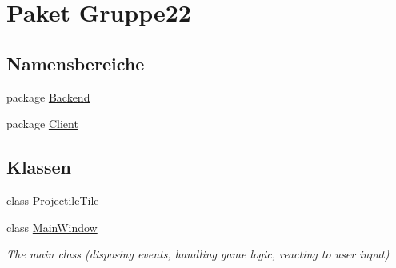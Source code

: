 \hypertarget{namespace_gruppe22}{\section{Paket Gruppe22}
\label{namespace_gruppe22}
}
\subsection*{Namensbereiche}
\begin{DoxyCompactItemize}
\item 
package \hyperlink{namespace_gruppe22_1_1_backend}{Backend}
\item 
package \hyperlink{namespace_gruppe22_1_1_client}{Client}
\end{DoxyCompactItemize}
\subsection*{Klassen}
\begin{DoxyCompactItemize}
\item 
class \hyperlink{class_gruppe22_1_1_projectile_tile}{Projectile\-Tile}
\item 
class \hyperlink{class_gruppe22_1_1_main_window}{Main\-Window}
\begin{DoxyCompactList}\small\item\em The main class (disposing events, handling game logic, reacting to user input) \end{DoxyCompactList}\end{DoxyCompactItemize}
